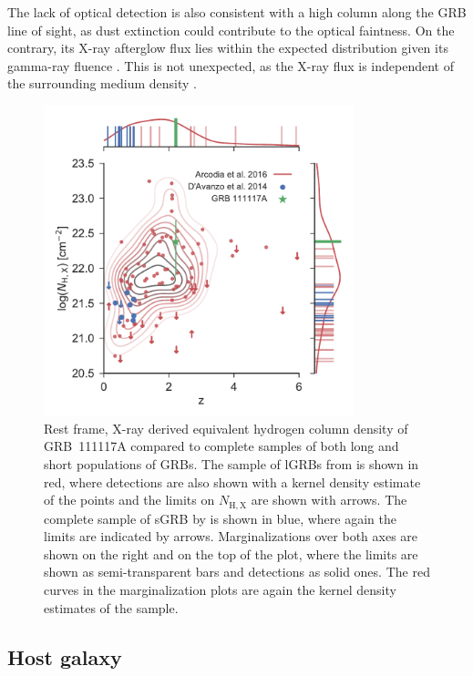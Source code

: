 \documentclass[referee]{aa}
\begin{document}
The lack of optical detection is also consistent with a high column along the
GRB line of sight, as dust extinction could contribute to the optical faintness.
On the contrary, its X-ray afterglow flux lies within the expected distribution
given its gamma-ray fluence \citep{DAvanzo2014a}. This is not unexpected, as the
X-ray flux is independent of the surrounding medium density \citep{Freedman2001,
	Berger2003, Nysewander2009}.

\begin{figure}
	\centering \includegraphics[width=9cm]{figures/NH_z.pdf} \caption{Rest frame,
	X-ray derived equivalent hydrogen column density of GRB~111117A compared to
	complete samples of both long and short populations of GRBs. The sample of
	lGRBs from \citet{Arcodia2016} is shown in red, where detections are also shown
	with a kernel density estimate of the points and the limits on $N_\mathrm{H,X}$
	are shown with arrows. The complete sample of sGRB by \citet{DAvanzo2014a} is
	shown in blue, where again the limits are indicated by arrows. Marginalizations
	over both axes are shown on the right and on the top of the plot, where the
	limits are shown as semi-transparent bars and detections as solid ones. The red
	curves in the marginalization plots are again the kernel density estimates of
	the \citet{Arcodia2016} sample.} \label{fig:NH_z}
\end{figure}


\subsection{Host galaxy}
\end{document}
